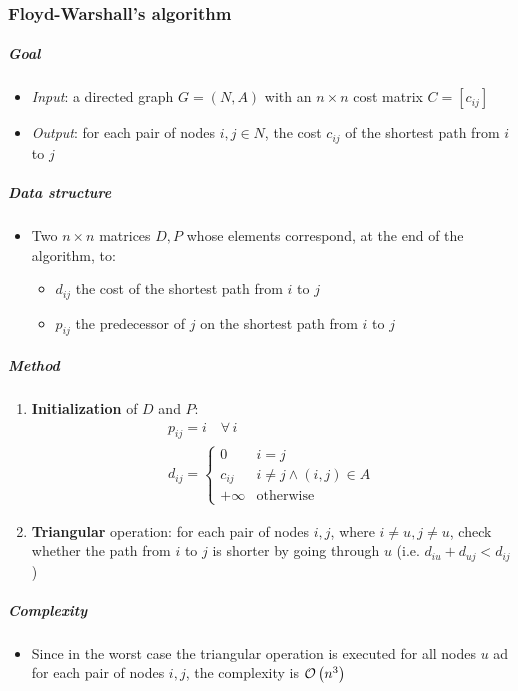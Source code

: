 \documentclass[english]{article}
\begin{document}
\subsubsection{Floyd-Warshall's algorithm}

\subparagraph*{Goal}
\begin{itemize}[label=\(\rightarrow\)]
  \item \textit{Input}: a directed graph \(G = (N, A)\) with an \(n \times n\) cost matrix \(C = [c_{ij}]\)
  \item \textit{Output}: for each pair of nodes \(i, j \in N\), the cost \(c_{ij}\) of the shortest path from \(i\) to \(j\)
\end{itemize}

\subparagraph*{Data structure}
\begin{itemize}
  \item Two \(n \times n\) matrices \(D, P\) whose elements correspond, at the end of the algorithm, to:
        \begin{itemize}
          \item \(d_{ij}\) the cost of the shortest path from \(i\) to \(j\)
          \item \(p_{ij}\) the predecessor of \(j\) on the shortest path from \(i\) to \(j\)
        \end{itemize}
\end{itemize}

\subparagraph*{Method}
\begin{enumerate}
  \item \textbf{Initialization} of \(D\) and \(P\):
        \begin{gather*}
          p_{ij} = i \quad \forall \, i \\
          d_{ij} = \begin{cases} 0 \quad & i = j \\ c_{ij} & i \neq j \land (i, j) \in A \\ +\infty & \text{otherwise}  \end{cases}
        \end{gather*}

  \item \textbf{Triangular} operation: for each pair of nodes \(i, j\), where \(i \neq u, j \neq u\), check whether the path from \(i\) to \(j\) is shorter by going through \(u\) (i.e. \(d_{iu} + d_{uj} < d_{ij}\))
\end{enumerate}

\subparagraph*{Complexity}
\begin{itemize}
  \item Since in the worst case the triangular operation is executed for all nodes \(u\) ad for each pair of nodes \(i, j\), the complexity is \(\mathcal{O}\left(n^3\right)\)
\end{itemize}
\end{document}

